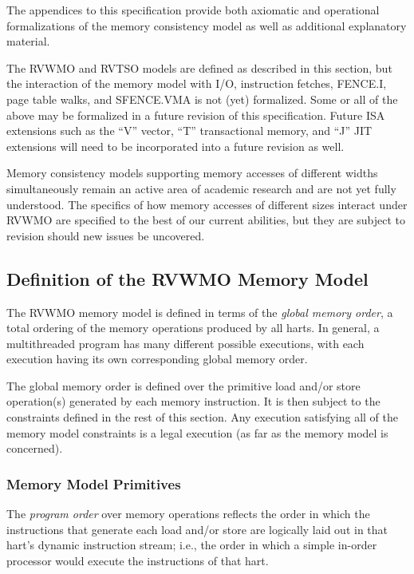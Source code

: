 The appendices to this specification provide both axiomatic and operational formalizations of the memory consistency model as well as additional explanatory material.

\begin{commentary}
  The RVWMO and RVTSO models are defined as described in this section, but the interaction of the memory model with I/O, instruction fetches, FENCE.I, page table walks, and SFENCE.VMA is not (yet) formalized.  Some or all of the above may be formalized in a future revision of this specification.  Future ISA extensions such as the ``V'' vector, ``T'' transactional memory, and ``J'' JIT extensions will need to be incorporated into a future revision as well.

  Memory consistency models supporting memory accesses of different widths simultaneously remain an active area of academic research and are not yet fully understood.  The specifics of how memory accesses of different sizes interact under RVWMO are specified to the best of our current abilities, but they are subject to revision should new issues be uncovered.
\end{commentary}

\subsection*{Definition of the RVWMO Memory Model}
\label{sec:rvwmo}

The RVWMO memory model is defined in terms of the {\em global memory order}, a total ordering of the memory operations produced by all harts.
In general, a multithreaded program has many different possible executions, with each execution having its own corresponding global memory order.

The global memory order is defined over the primitive load and/or store operation(s) generated by each memory instruction.
It is then subject to the constraints defined in the rest of this section.
Any execution satisfying all of the memory model constraints is a legal execution (as far as the memory model is concerned).

\subsubsection*{Memory Model Primitives}
\label{sec:rvwmo:primitives}
The {\em program order} over memory operations reflects the order in which the instructions that generate each load and/or store are logically laid out in that hart's dynamic instruction stream; i.e., the order in which a simple in-order processor would execute the instructions of that hart.

